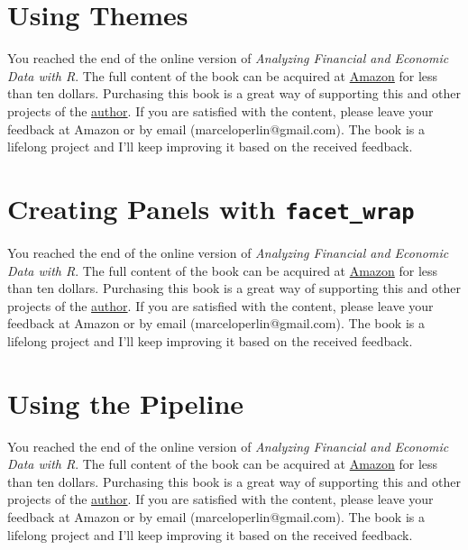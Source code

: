 \documentclass[
  12pt,
]{book}
\newenvironment{pleasebuyit}
{\begin{noteblock}
		
	} {\end{noteblock}}
\begin{document}
\hypertarget{using-themes}{%
\section{Using Themes}\label{using-themes}}

\begin{pleasebuyit}
You reached the end of the online version of \emph{Analyzing Financial
and Economic Data with R}. The full content of the book can be acquired
at \href{https://www.amazon.com/dp/B084LSNXMN}{Amazon} for less than ten
dollars. Purchasing this book is a great way of supporting this and
other projects of the \href{https://www.msperlin.com/}{author}. If you
are satisfied with the content, please leave your feedback at Amazon or
by email (marceloperlin@gmail.com). The book is a lifelong project and
I'll keep improving it based on the received feedback.
\end{pleasebuyit}

\hypertarget{creating-panels-with-facet_wrap}{%
\section{\texorpdfstring{Creating Panels with \texttt{facet\_wrap}}{Creating Panels with facet\_wrap}}\label{creating-panels-with-facet_wrap}}

\begin{pleasebuyit}
You reached the end of the online version of \emph{Analyzing Financial
and Economic Data with R}. The full content of the book can be acquired
at \href{https://www.amazon.com/dp/B084LSNXMN}{Amazon} for less than ten
dollars. Purchasing this book is a great way of supporting this and
other projects of the \href{https://www.msperlin.com/}{author}. If you
are satisfied with the content, please leave your feedback at Amazon or
by email (marceloperlin@gmail.com). The book is a lifelong project and
I'll keep improving it based on the received feedback.
\end{pleasebuyit}

\hypertarget{using-the-pipeline}{%
\section{Using the Pipeline}\label{using-the-pipeline}}

\begin{pleasebuyit}
You reached the end of the online version of \emph{Analyzing Financial
and Economic Data with R}. The full content of the book can be acquired
at \href{https://www.amazon.com/dp/B084LSNXMN}{Amazon} for less than ten
dollars. Purchasing this book is a great way of supporting this and
other projects of the \href{https://www.msperlin.com/}{author}. If you
are satisfied with the content, please leave your feedback at Amazon or
by email (marceloperlin@gmail.com). The book is a lifelong project and
I'll keep improving it based on the received feedback.
\end{pleasebuyit}
\end{document}
